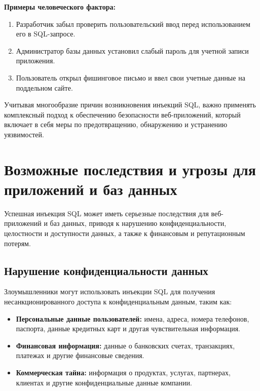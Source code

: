\documentclass[a4paper,12pt]{diplom}
\begin{document}
	\textbf{Примеры человеческого фактора:}
	
	\begin{enumerate}[label=\arabic{enumi})]
		\item Разработчик забыл проверить пользовательский ввод перед использованием его в SQL-запросе.
		\item Администратор базы данных установил слабый пароль для учетной записи приложения. 
		\item Пользователь открыл фишинговое письмо и ввел свои учетные данные на поддельном сайте. 
	\end{enumerate}
	
	 Учитывая многообразие причин возникновения инъекций SQL,  важно применять комплексный подход к обеспечению безопасности веб-приложений,  который включает в себя меры по предотвращению,  обнаружению и устранению уязвимостей.
	 
	 
	 
	 
	 
	 
	 
	 
	 \section{Возможные последствия и угрозы для приложений и баз данных}
	 
	 Успешная инъекция SQL может иметь серьезные последствия для веб-приложений и баз данных, приводя к нарушению конфиденциальности, целостности и доступности данных, а также к финансовым и репутационным потерям. 
	 
	 \subsection{Нарушение конфиденциальности данных}
	 
	 Злоумышленники могут использовать инъекции SQL для получения несанкционированного доступа к конфиденциальным данным, таким как:
	 
	 \begin{itemize}
	 	\item \textbf{Персональные данные пользователей:} имена, адреса, номера телефонов, паспорта, данные кредитных карт и другая чувствительная информация.
	 	\item \textbf{Финансовая информация:} данные о банковских счетах, транзакциях, платежах и другие финансовые сведения.
	 	\item \textbf{Коммерческая тайна:} информация о продуктах, услугах, партнерах, клиентах и другие конфиденциальные данные компании. 
	 \end{itemize}
	 
\end{document}
